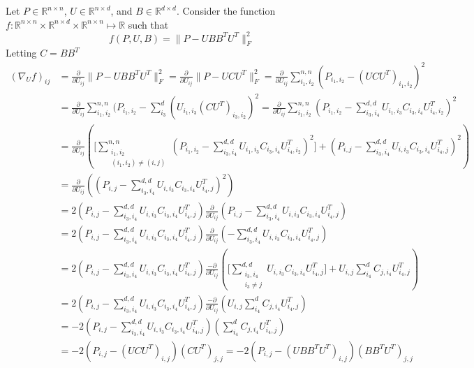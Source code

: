 \documentclass{report}
\begin{document}
   	\newpage
   	Let $ P \in \mathbb{R}^{n \times n} $, $ U \in \mathbb{R}^{n \times d} $, and $B \in \mathbb{R}^{d \times d} $. Consider the function $ f: \mathbb{R}^{n \times n} \times \mathbb{R}^{n \times d} \times \mathbb{R}^{n \times n} \mapsto \mathbb{R} $ such that 
   	\[ 
   	  f(P,U,B) = \|P - UBB^TU^T\|_F^2
   	\]
   	Letting $ C = BB^T $
   	\begin{align*}
   		 (\nabla_{U}f)_{ij}
   		 &= \frac{\partial}{\partial U_{ij}}\|P - UBB^TU^T\|_F^2 
   		  = \frac{\partial}{\partial U_{ij}}\|P - UCU^T\|_F^2 
   		  = \frac{\partial}{\partial U_{ij}}\displaystyle \sum_{i_1,i_2}^{n,n} (P_{i_1,i_2} -  (UCU^T)_{i_1,i_2})^2 \\
   		 &= \frac{\partial}{\partial U_{ij}} \sum_{i_1,i_2}^{n,n} (P_{i_1,i_2} -    \sum_{i_3}^{d}(U_{i_1,i_3}(CU^T)_{i_3,i_2})^2 
   		  = \frac{\partial}{\partial U_{ij}} \sum_{i_1,i_2}^{n,n} (P_{i_1,i_2} - \sum_{i_3,i_4}^{d,d}U_{i_1,i_3}C_{i_3,i_4}U^T_{i_4,i_2})^2 \\
   		 &= \frac{\partial}{\partial U_{ij}} (\big[\sum_{\substack{i_1,i_2 \\ (i_1,i_2) \neq (i,j)}}^{n,n} (P_{i_1,i_2} - \sum_{i_3,i_4}^{d,d}U_{i_1,i_3}C_{i_3,i_4}U^T_{i_4,i_2})^2\big] + (P_{i,j} - \sum_{i_3,i_4}^{d,d}U_{i,i_3}C_{i_3,i_4}U^T_{i_4,j})^2) \\
   		 &= \frac{\partial}{\partial U_{ij}}((P_{i,j} - \sum_{i_3,i_4}^{d,d}U_{i,i_3}C_{i_3,i_4}U^T_{i_4,j})^2) \\
   		 &= 2(P_{i,j} - \sum_{i_3,i_4}^{d,d}U_{i,i_3}C_{i_3,i_4}U^T_{i_4,j})\frac{\partial}{\partial U_{ij}}(P_{i,j} - \sum_{i_3,i_4}^{d,d}U_{i,i_3}C_{i_3,i_4}U^T_{i_4,j}) \\
   		 &= 2(P_{i,j} - \sum_{i_3,i_4}^{d,d}U_{i,i_3}C_{i_3,i_4}U^T_{i_4,j})\frac{\partial}{\partial U_{ij}}(-\sum_{i_3,i_4}^{d,d}U_{i,i_3}C_{i_3,i_4}U^T_{i_4,j}) \\
   		 &= 2(P_{i,j} - \sum_{i_3,i_4}^{d,d}U_{i,i_3}C_{i_3,i_4}U^T_{i_4,j})\frac{-\partial}{\partial U_{ij}}(\big[\sum_{\substack{i_3,i_4\\ i_3 \neq j}}^{d,d}U_{i,i_3}C_{i_3,i_4}U^T_{i_4,j}\big] + U_{i,j}\sum_{i_4}^dC_{j,i_4}U^T_{i_4,j}) \\
   		 &=2(P_{i,j} - \sum_{i_3,i_4}^{d,d}U_{i,i_3}C_{i_3,i_4}U^T_{i_4,j})\frac{-\partial}{\partial U_{ij}}(U_{i,j}\sum_{i_4}^dC_{j,i_4}U^T_{i_4,j}) \\
   		 &= -2(P_{i,j} - \sum_{i_3,i_4}^{d,d}U_{i,i_3}C_{i_3,i_4}U^T_{i_4,j})(\sum_{i_4}^dC_{j,i_4}U^T_{i_4,j}) \\
   		 &= -2(P_{i,j} - (UCU^T)_{i,j})(CU^T)_{j,j}
   		 = -2(P_{i,j} - (UBB^TU^T)_{i,j})(BB^TU^T)_{j,j}   	
   		 \end{align*}
\end{document}
